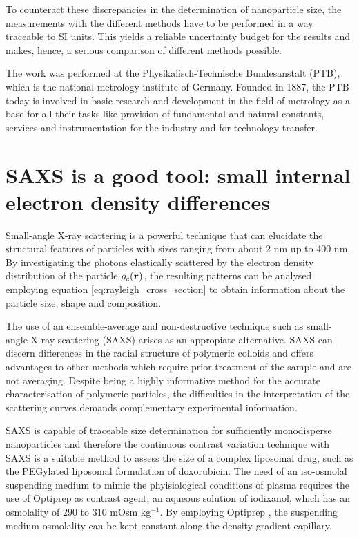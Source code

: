To counteract these discrepancies in the determination of nanoparticle size, the measurements with the different methods have to be performed in a way traceable to SI units. This yields a reliable uncertainty budget for the results and makes, hence, a serious comparison of different methods possible. 

The work was performed at the Physikalisch-Technische Bundesanstalt (PTB), which is the national metrology institute of Germany. Founded in 1887, the PTB today is involved in basic research and development in the field of metrology as a base for all their tasks like provision of fundamental and natural constants, services and instrumentation for the industry and for technology transfer.

\section{SAXS is a good tool: small internal electron density differences}

Small-angle X-ray scattering is a powerful technique that can elucidate the structural features of particles with sizes ranging from about 2 nm up to 400 nm. By investigating the photons elastically scattered by the electron density distribution of the particle $\rho_e ( \bm{r} )$, the resulting patterns can be analysed employing equation \ref{eq:rayleigh_cross_section} to obtain information about the particle size, shape and composition.

The use of an ensemble-average and non-destructive technique such as small-angle X-ray scattering (SAXS) arises as an appropiate alternative\citep{leonard_jr_size_1952,motzkus_untersuchung_1959}. SAXS can discern differences in the radial structure of polymeric colloids and offers advantages to other methods which require prior treatment of the sample and are not averaging\citep{silverstein_microstructure_1989,joensson_morphology_1991}. Despite being a highly informative method for the accurate characterisation of polymeric particles, the difficulties in the interpretation of the scattering curves demands complementary experimental information\citep{mykhaylyk_structural_2012}.

SAXS is capable of traceable size determination for sufficiently monodisperse nanoparticles \citep{meli_traceable_2012} and therefore the continuous contrast variation technique with SAXS is a suitable method to assess the size of a complex liposomal drug, such as the PEGylated liposomal formulation of doxorubicin. The need of an iso-osmolal suspending medium to mimic the phyisiological conditions of plasma requires the use of Optiprep \textregistered as contrast agent, an aqueous solution of iodixanol, which has an osmolality of 290 to 310 mOsm kg$^{-1}$. By employing Optiprep \textregistered, the suspending medium osmolality can be kept constant along the density gradient capillary.

